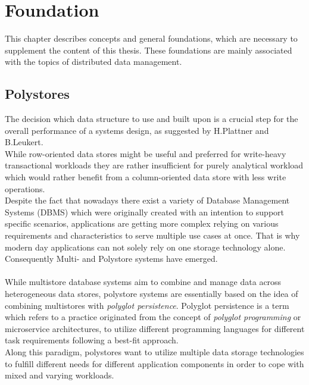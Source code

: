 \chapter{Foundation}
\label{c:Foundation}

This chapter describes concepts and general foundations, which are necessary to supplement 
the content of this thesis. These foundations are mainly associated with the topics of distributed data management.

\section{Polystores}

The decision which data structure to use and built upon is a crucial step for the overall performance of a systems design, as suggested by
H.Plattner and B.Leukert\cite{plattner2015}.\\
While row-oriented data stores might be useful and preferred for write-heavy transactional 
workloads they are rather insufficient for purely analytical workload which would rather benefit from a
column-oriented data store with less write operations\cite{sigmond2008}.\\

Despite the fact that nowadays there exist a variety of Database Management Systems (DBMS) which were originally created with an intention to
support specific scenarios,
applications are getting more complex relying on various requirements and characteristics 
to serve multiple use cases at once.
That is why modern day applications can not solely rely on one storage technology alone. 
Consequently Multi- and Polystore systems have emerged. \\
\\
While multistore database systems aim to combine and manage data across heterogeneous data stores,
polystore systems are essentially based on the idea of combining multistores with
\textit{polyglot persistence}\cite{polypheny2020}.
Polyglot persistence is a term which refers to a practice originated from the concept 
of \textit{polyglot programming} or microservice architectures, to utilize different 
programming languages for different task requirements following a best-fit approach\cite{fowler2011}. \\
Along this paradigm, polystores want to utilize multiple data storage technologies to
fulfill different needs for different application components in order to cope
with mixed and varying workloads.

